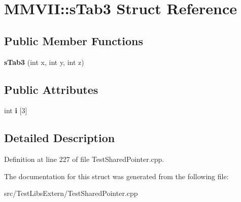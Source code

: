 \hypertarget{structMMVII_1_1sTab3}{}\section{M\+M\+V\+II\+:\+:s\+Tab3 Struct Reference}
\label{structMMVII_1_1sTab3}
\subsection*{Public Member Functions}
\begin{DoxyCompactItemize}
\item 
{\bfseries s\+Tab3} (int x, int y, int z)\hypertarget{structMMVII_1_1sTab3_aa12576e82f03a7e93b6b877e8438545b}{}\label{structMMVII_1_1sTab3_aa12576e82f03a7e93b6b877e8438545b}

\end{DoxyCompactItemize}
\subsection*{Public Attributes}
\begin{DoxyCompactItemize}
\item 
int {\bfseries i} \mbox{[}3\mbox{]}\hypertarget{structMMVII_1_1sTab3_a2c43c3119c2159337072232fd718d8bd}{}\label{structMMVII_1_1sTab3_a2c43c3119c2159337072232fd718d8bd}

\end{DoxyCompactItemize}


\subsection{Detailed Description}


Definition at line 227 of file Test\+Shared\+Pointer.\+cpp.



The documentation for this struct was generated from the following file\+:\begin{DoxyCompactItemize}
\item 
src/\+Test\+Libs\+Extern/Test\+Shared\+Pointer.\+cpp\end{DoxyCompactItemize}
